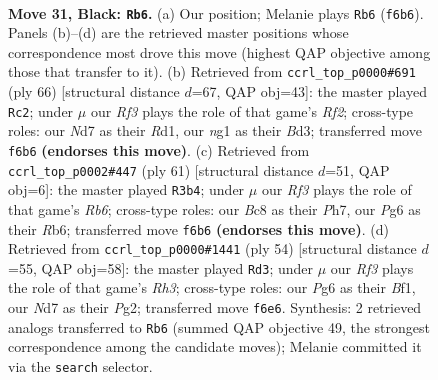 \documentclass[11pt]{article}
\begin{document}
\clearpage

\begin{figure}[p]\centering
\begin{subfigure}{0.46\textwidth}\centering
\resizebox{\linewidth}{!}{%
\newchessgame
\chessboard[
  setfen={2b3k1/3n1p1p/5rp1/3Pp3/1p2P3/1r3PP1/5K1P/R5NR b - - 5 31},
  showmover=false,
  pgfstyle=straightmove, color=movearrow, markmove={f6-b6}
]}
\caption{}
\end{subfigure}\hfill
\begin{subfigure}{0.46\textwidth}\centering
\resizebox{\linewidth}{!}{%
\newchessgame
\chessboard[
  setfen={5r2/4rpk1/1p1p2p1/1P1P2pn/p3P3/3B3P/P4RP1/3R2K1 w - - 0 34},
  showmover=false,
  pgfstyle=straightmove, color=movearrow, markmove={f2-c2}
]}
\caption{}
\end{subfigure}
\\[4pt]
\begin{subfigure}{0.46\textwidth}\centering
\resizebox{\linewidth}{!}{%
\newchessgame
\chessboard[
  setfen={8/5p1p/1r2pk2/p1n3p1/2P5/1r4PP/1NR1BPK1/1R6 b - - 3 31},
  showmover=false,
  pgfstyle=straightmove, color=movearrow, markmove={b3-b4}
]}
\caption{}
\end{subfigure}\hfill
\begin{subfigure}{0.46\textwidth}\centering
\resizebox{\linewidth}{!}{%
\newchessgame
\chessboard[
  setfen={r6r/5p2/2pk3p/p2npP2/5p2/P6R/1PP3PP/2K1RB2 w - - 0 28},
  showmover=false,
  pgfstyle=straightmove, color=movearrow, markmove={h3-d3}
]}
\caption{}
\end{subfigure}
\caption{\textbf{Move 31, Black: \texttt{Rb6}.} (a) Our position; Melanie plays \texttt{Rb6} (\texttt{f6b6}). Panels (b)--(d) are the retrieved master positions whose correspondence most drove this move (highest QAP objective among those that transfer to it). (b) Retrieved from \texttt{ccrl\_top\_p0000\#691} (ply 66) [structural distance $d$=67, QAP obj=43]: the master played \texttt{Rc2}; under $\mu$ our \emph{Rf3} plays the role of that game's \emph{Rf2}; cross-type roles: our \emph{N}d7 as their \emph{R}d1, our \emph{n}g1 as their \emph{B}d3; transferred move \texttt{f6b6} \textbf{(endorses this move)}. (c) Retrieved from \texttt{ccrl\_top\_p0002\#447} (ply 61) [structural distance $d$=51, QAP obj=6]: the master played \texttt{R3b4}; under $\mu$ our \emph{Rf3} plays the role of that game's \emph{Rb6}; cross-type roles: our \emph{B}c8 as their \emph{P}h7, our \emph{P}g6 as their \emph{R}b6; transferred move \texttt{f6b6} \textbf{(endorses this move)}. (d) Retrieved from \texttt{ccrl\_top\_p0000\#1441} (ply 54) [structural distance $d$=55, QAP obj=58]: the master played \texttt{Rd3}; under $\mu$ our \emph{Rf3} plays the role of that game's \emph{Rh3}; cross-type roles: our \emph{P}g6 as their \emph{B}f1, our \emph{N}d7 as their \emph{P}g2; transferred move \texttt{f6e6}. Synthesis: 2 retrieved analogs transferred to \texttt{Rb6} (summed QAP objective 49, the strongest correspondence among the candidate moves); Melanie committed it via the \texttt{search} selector.}
\label{fig:thought-m61}
\end{figure}
\end{document}
